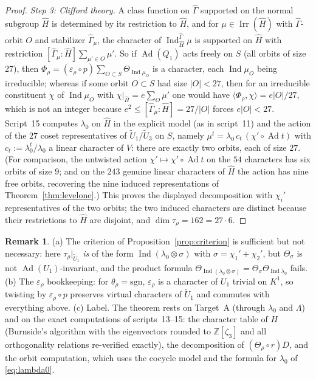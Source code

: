 \documentclass[11pt]{article}
\newcommand{\Z}{\mathbb Z}
\newcommand{\Irr}{\operatorname{Irr}}
\newcommand{\Ind}{\operatorname{Ind}}
\newcommand{\Ad}{\operatorname{Ad}}
\newcommand{\tU}{\widetilde U}
\theoremstyle{plain}
\theoremstyle{definition}
\newtheorem{remark}[theorem]{Remark}
\begin{document}
\begin{proof}
\emph{Step 3: Clifford theory.}  A class function on $\hat\Gamma$
supported on the normal subgroup $\hat H$ is determined by its
restriction to $\hat H$, and for $\mu\in\Irr(\hat H)$ with
$\hat\Gamma$-orbit $O$ and stabilizer $\hat\Gamma_\mu$, the character of
$\Ind_{\hat H}^{\hat\Gamma}\mu$ is supported on $\hat H$ with restriction
$[\hat\Gamma_\mu:\hat H]\sum_{\mu'\in O}\mu'$.  So if $\Ad(Q_1)$ acts
freely on $S$ (all orbits of size $27$), then
$\Phi_\rho=(\varepsilon_\rho\circ p)\sum_{O\subset S}\Theta_{\Ind\mu_O}$
is a character, each $\Ind\mu_O$ being irreducible; whereas if some
orbit $O\subset S$ had size $|O|<27$, then for an irreducible
constituent $\chi$ of $\Ind\mu_O$ with $\chi|_{\hat H}=e\sum_O\mu'$ one
would have $\langle\Phi_\rho,\chi\rangle=e|O|/27$, which is not an
integer because $e^2\le[\hat\Gamma_\mu:\hat H]=27/|O|$ forces
$e|O|<27$.  Script~15 computes $\lambda_0$ on $\hat H$ in the explicit
model (as in script~11) and the action of the $27$ coset
representatives of $\tU_1/\tU_3$ on $S$, namely
$\mu^t=\lambda_0\,c_t\,(\chi'\circ\Ad t)$ with $c_t:=\lambda_0^t/\lambda_0$
a linear character of $V$: there are exactly two orbits, each of size
$27$.  (For comparison, the untwisted action $\chi'\mapsto\chi'\circ\Ad t$
on the $54$ characters has six orbits of size $9$; and on the $243$
genuine linear characters of $\hat H$ the action has nine free orbits,
recovering the nine induced representations of
Theorem~\ref{thm:levelone}.)  This proves the displayed decomposition
with $\chi_i'$ representatives of the two orbits; the two induced
characters are distinct because their restrictions to $\hat H$ are
disjoint, and $\dim\tau_\rho=162=27\cdot6$.
\end{proof}

\begin{remark}
(a) The criterion of Proposition~\ref{prop:criterion} is sufficient but
not necessary: here $\tau_\rho|_{\tU_1}$ \emph{is} of the form
$\Ind(\lambda_0\otimes\sigma)$ with $\sigma=\chi_1'+\chi_2'$, but
$\Theta_\sigma$ is not $\Ad(U_1)$-invariant, and the product formula
$\Theta_{\Ind(\lambda_0\otimes\sigma)}=\Theta_\sigma\Theta_{\Ind\lambda_0}$
fails.
(b) The $\varepsilon_\rho$ bookkeeping: for $\theta_\rho=\mathrm{sgn}$,
$\varepsilon_\rho$ is a character of $U_1$ trivial on $K^1$, so twisting
by $\varepsilon_\rho\circ p$ preserves virtual characters of $\tU_1$ and
commutes with everything above.
(c) Label.  The theorem rests on Target~A (through $\lambda_0$ and
$\Lambda$) and on the exact computations of scripts~13--15: the
character table of $H$ (Burnside's algorithm with the eigenvectors
rounded to $\Z[\zeta_3]$ and all orthogonality relations re-verified
exactly), the decomposition of $(\Theta_\rho\circ r)D$, and the orbit
computation, which uses the cocycle model and the formula for
$\lambda_0$ of \eqref{eq:lambda0}.
\end{remark}
\end{document}
